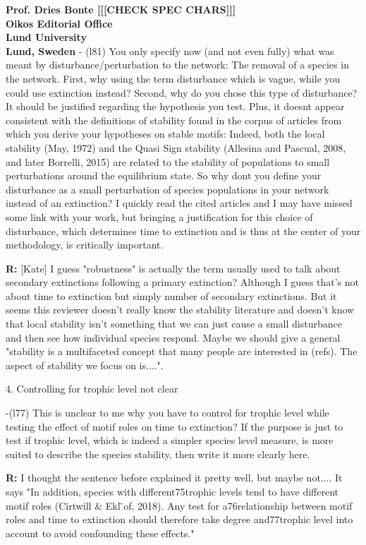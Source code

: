 \documentclass[12pt]{letter}
\begin{document}
\begin{letter}{\bf Prof. Dries Bonte [[[CHECK SPEC CHARS]]]\\
Oikos Editorial Office \\
Lund University \\
Lund, Sweden}
      - (l81) You only specify now (and not even fully) what was meant by disturbance/perturbation to the network: The removal of a species in the network. First, why using the term disturbance which is vague, while you could use extinction instead? Second, why do you chose this type of disturbance? It should be justified regarding the hypothesis you test. Plus, it doesnt appear consistent with the definitions of stability found in the corpus of articles from which you derive your hypotheses on stable motifs: Indeed, both the local stability (May, 1972) and the Quasi Sign stability (Allesina and Pascual, 2008, and later Borrelli, 2015) are related to the stability of populations to small perturbations around the equilibrium state. So why dont you define your disturbance as a small perturbation of species populations in your network instead of an extinction? I quickly read the cited articles and I may have missed some link with your work, but bringing a justification for this choice of disturbance, which determines time to extinction and is thus at the center of your methodology, is critically important.

      \textbf{R:} [Kate]
      I guess "robustness" is actually the term usually used to talk about secondary extinctions following a primary extinction? Although I guess that's not about time to extinction but simply number of secondary extinctions. But it seems this reviewer doesn't really know the stability literature and doesn't know that local stability isn't something that we can just cause a small disturbance and then see how individual species respond. Maybe we should give a general "stability is a multifaceted concept that many people are interested in (refs). The aspect of stability we focus on is....".


    4. Controlling for trophic level not clear

      -(l77) This is unclear to me why you have to control for trophic level while testing the effect of motif roles on time to extinction? If the purpose is just to test if trophic level, which is indeed a simpler species level measure, is more suited to describe the species stability, then write it more clearly here.

      \textbf{R:}
      I thought the sentence before explained it pretty well, but maybe not.... It says "In addition, species with different75trophic levels tend to have different motif roles (Cirtwill & Ekl ̈of, 2018). Any test for a76relationship between motif roles and time to extinction should therefore take degree and77trophic level into account to avoid confounding these effects."



\end{letter}
\end{document}
